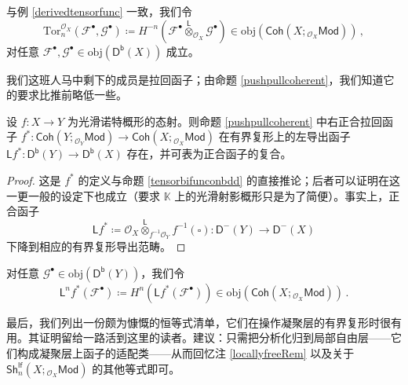 与例 \ref{derivedtensorfunc} 一致，我们令
\begin{equation}
\text{Tor}_n^{\mathcal{O}_X}(\mathcal{F}^\bullet,\mathcal{G}^\bullet)\coloneqq H^{-n}(\mathcal{F}^\bullet\overset{\mathsf{L}}{\otimes}_{\mathcal{O}_X}\mathcal{G}^\bullet)\in\text{obj}(\mathsf{Coh}(X;{}_{\mathcal{O}_X}\!\mathsf{Mod}))\,,
\end{equation}
对任意 $\mathcal{F}^\bullet,\mathcal{G}^\bullet\in\text{obj}(\mathsf{D^b}(X))$ 成立。

\vspace*{0.3cm}
\noindent 我们这班人马中剩下的成员是拉回函子；由命题 \ref{pushpullcoherent}，我们知道它的要求比推前略低一些。

\begin{Cor}
设 $f:X\rightarrow Y$ 为光滑诺特概形的态射。则命题 \ref{pushpullcoherent} 中右正合拉回函子 $f^*:\mathsf{Coh}(Y;{}_{\mathcal{O}_Y}\!\mathsf{Mod})\rightarrow\mathsf{Coh}(X;{}_{\mathcal{O}_X}\!\mathsf{Mod})$ 在有界复形上的左导出函子 $\mathsf{L}f^*:\mathsf{D^b}(Y)\rightarrow\mathsf{D^b}(X)$ 存在，并可表为正合函子的复合。
\end{Cor}

\begin{proof}
这是 $f^*$ 的定义与命题 \ref{tensorbifunconbdd} 的直接推论；后者可以证明在这一更一般的设定下也成立（要求 $\mathbb{K}$ 上的光滑射影概形只是为了简便）。事实上，正合函子
\[
\mathsf{L}f^*\coloneqq \mathcal{O}_X\overset{\mathsf{L}}{\otimes}_{f^{-1}\mathcal{O}_Y}\!f^{-1}(\square):\mathsf{D^-}(Y)\rightarrow\mathsf{D^-}(X)
\]
下降到相应的有界复形导出范畴。
\end{proof} 

对任意 $\mathcal{G}^\bullet\in\text{obj}(\mathsf{D^b}(Y))$，我们令
\begin{equation}
\mathsf{L}^nf^*(\mathcal{F}^\bullet)\coloneqq H^n(\mathsf{L}f^*(\mathcal{F}^\bullet))\in\text{obj}(\mathsf{Coh}(X;{}_{\mathcal{O}_X}\!\mathsf{Mod}))\,.
\end{equation}

最后，我们列出一份颇为慷慨的恒等式清单，它们在操作凝聚层的有界复形时很有用。其证明留给一路活到这里的读者。建议：只需把分析化归到局部自由层——它们构成凝聚层上函子的适配类——从而回忆注 \ref{locallyfreeRem} 以及关于 $\mathsf{Sh}^\mathsf{lf}_n(X;{}_{\mathcal{O}_X}\!\mathsf{Mod})$ 的其他等式即可。

